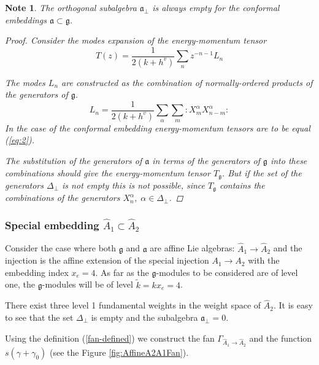 \documentclass[a4paper,12pt]{article}
\newtheorem{note}{Note}[section]
\theoremstyle{definition} \newtheorem{Def}{Definition}
\begin{document}
\begin{note} The orthogonal subalgebra $\mathfrak{a}_{\bot}$ is always empty for the conformal embeddings $\mathfrak{a}\subset \mathfrak{g}$.
\begin{proof} 
Consider the modes expansion of the energy-momentum tensor
\begin{equation}
\label{eq:47}
  T(z)=\frac{1}{2(k+h^v)}\sum_n z^{-n-1}L_n
\end{equation}

The modes $L_n$ are constructed as the combination of normally-ordered products of the generators of $\mathfrak{g}$.
\begin{equation}
\label{eq:48}
  L_n=\frac{1}{2(k+h^v)}\sum_{\alpha}\sum_m:X^{\alpha}_m X^{\alpha}_{n-m}:
\end{equation}
In the case of the conformal embedding energy-momentum tensors are to be equal (\ref{eq:2}).

The substitution of the generators of $\mathfrak{a}$  in terms of the generators of $\mathfrak{g}$ into these combinations  should give the energy-momentum tensor $T_{\mathfrak{g}}$. But if the set of the generators $\Delta_{\bot}$ is not empty this is not possible, since $T_{\mathfrak{g}}$ contains the combinations of the generators $X^{\alpha}_n, \; \alpha\in \Delta_{\bot}$.
\end{proof}
\end{note}
\subsubsection{Special embedding $\hat{A}_1\subset\hat{A}_2$}
\label{sec:spec-embedd-hata_1s}
Consider the case where both $\mathfrak{g}$ and $\mathfrak{a}$ are affine Lie algebras:
$\hat{A}_1 \longrightarrow \hat{A}_2$ and the injection is the affine extension of the
special injection $A_1 \longrightarrow A_2$ with the embedding index $x_e=4$.
As far as the $\mathfrak{g}$-modules to be considered are of level one,
the $\mathfrak{g}$-modules will be of level $\tilde{k}=kx_e=4$.

There exist three level 1 fundamental weights in the weight space of $\hat{A}_2$.
It is easy to see that the set $\Delta_{\bot}$ is empty and the subalgebra $\mathfrak{a}_{\bot}=0$.

Using the definition (\ref{fan-defined})  we construct the fan $\Gamma_{\hat A_1\to\hat A_2}$
and the function $s(\gamma+\gamma_0)$ (see the Figure \ref{fig:AffineA2A1Fan}).
\end{document}
